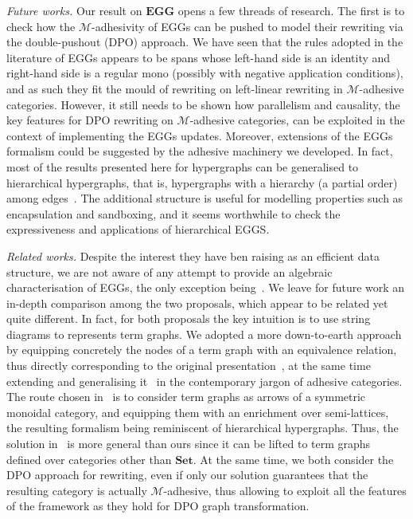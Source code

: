 \documentclass[3p]{elsarticle}
\newcommand{\Set}{\mathbf{Set}}
\newcommand{\eg}[0]{\mathbf{EGG}}
\theoremstyle{remark}
\theoremstyle{definition}
\begin{document}
\emph{Future works.}
Our result on $\eg$ opens a few threads of research. The first is to check how the $\mathcal{M}$-adhesivity 
of EGGs can be pushed to model their rewriting via the double-pushout (DPO) approach. We have seen that 
the rules adopted in the literature of EGGs appears to be spans whose left-hand side is an identity and 
right-hand side is a regular mono (possibly with negative application 
conditions), and as such they fit the mould of rewriting on left-linear rewriting in $\mathcal{M}$-adhesive categories. 
%
However, it still needs to be shown how parallelism and causality, the key features for DPO rewriting
on $\mathcal{M}$-adhesive categories, can be exploited in the context of implementing the 
EGGs updates. 
Moreover, extensions of the EGGs formalism could be suggested by the adhesive 
machinery we developed.
In fact, most of the results
presented here for hypergraphs can be generalised to hierarchical hypergraphs, that is, 
hypergraphs with a hierarchy (a partial order) among 
edges~\cite{ghicaZan,CastelnovoGM24}.
The additional structure is useful for modelling properties such as encapsulation and sandboxing,
and it seems worthwhile to check the expressiveness and applications of hierarchical EGGS.

\emph{Related works.}
Despite the interest they have ben raising as an efficient data structure, we are not aware of any attempt to provide an 
algebraic characterisation of EGGs, the only exception being~\cite{ghica}. We leave for future work an in-depth comparison 
among the two proposals, which appear to be related yet quite different.
%
In fact, for both proposals the key intuition is  to use string diagrams to represents term graphs. We adopted a
more down-to-earth approach by equipping
concretely the nodes of a term graph with an equivalence relation, thus directly corresponding to the original presentation~\cite{DetlefsNS05},
at the same time extending and generalising it~\cite{concur2006} in the contemporary jargon of adhesive categories.
The route chosen in~\cite{ghica} is to consider term graphs as arrows of a symmetric monoidal category,
and equipping them with an enrichment over semi-lattices, the resulting formalism being reminiscent of hierarchical hypergraphs.
Thus, the solution in~\cite{ghica}  is  more general than ours since it can be lifted to term graphs defined over categories other than
$\Set$. At the same time, we both consider the DPO approach for rewriting, even if only our solution guarantees that the resulting category
is actually $\mathcal{M}$-adhesive, thus allowing to exploit all the features of the framework
as they hold for DPO graph transformation.
\end{document}
